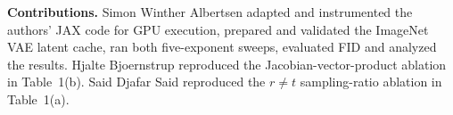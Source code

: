 \textbf{Contributions.} Simon Winther Albertsen adapted and instrumented the authors' JAX code for GPU execution, prepared and validated the ImageNet VAE latent cache, ran both five-exponent sweeps, evaluated FID and analyzed the results. Hjalte Bjoernstrup reproduced the Jacobian-vector-product ablation in Table~1(b). Said Djafar Said reproduced the $r\ne t$ sampling-ratio ablation in Table~1(a).
